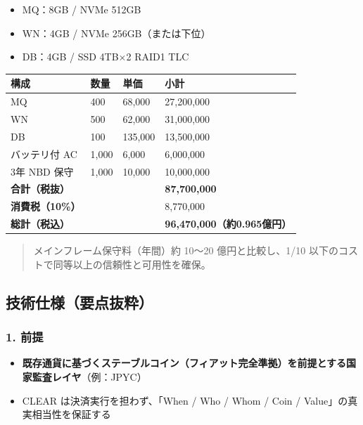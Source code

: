 \documentclass[
]{article}
\providecommand{\tightlist}{%
  \setlength{\itemsep}{0pt}\setlength{\parskip}{0pt}}
\begin{document}
\begin{itemize}
\tightlist
\item
  MQ：8GB / NVMe 512GB\\
\item
  WN：4GB / NVMe 256GB（または下位）\\
\item
  DB：4GB / SSD 4TB×2 RAID1 TLC
\end{itemize}

\begin{longtable}[]{@{}llll@{}}
\toprule\noalign{}
構成 & 数量 & 単価 & 小計 \\
\midrule\noalign{}
\endhead
\bottomrule\noalign{}
\endlastfoot
MQ & 400 & 68,000 & 27,200,000 \\
WN & 500 & 62,000 & 31,000,000 \\
DB & 100 & 135,000 & 13,500,000 \\
バッテリ付 AC & 1,000 & 6,000 & 6,000,000 \\
3年 NBD 保守 & 1,000 & 10,000 & 10,000,000 \\
\textbf{合計（税抜）} & & & \textbf{87,700,000} \\
\textbf{消費税（10\%）} & & & 8,770,000 \\
\textbf{総計（税込）} & & & \textbf{96,470,000（約0.965億円）} \\
\end{longtable}

\begin{quote}
メインフレーム保守料（年間）約 10〜20 億円と比較し、1/10
以下のコストで同等以上の信頼性と可用性を確保。
\end{quote}

\subsection{技術仕様（要点抜粋）}\label{ux6280ux8853ux4ed5ux69d8ux8981ux70b9ux629cux7c8b}

\subsubsection{1. 前提}\label{ux524dux63d0}

\begin{itemize}
\tightlist
\item
  \textbf{既存通貨に基づくステーブルコイン（フィアット完全準拠）を前提とする国家監査レイヤ}（例：JPYC）\\
\item
  CLEAR は決済実行を担わず、「When / Who / Whom / Coin /
  Value」の真実相当性を保証する
\end{itemize}
\end{document}
